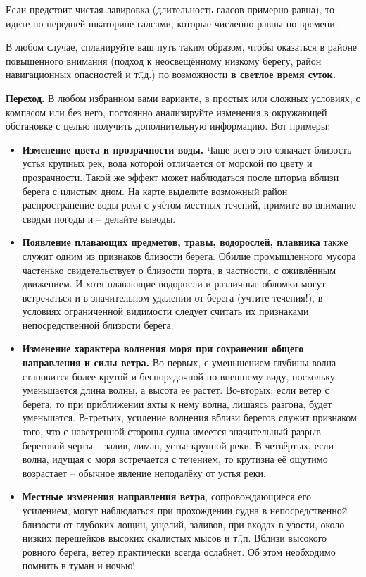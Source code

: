 \documentclass[a4paper, 12pt, twoside, final, book, russian, fittopage, cyremdash]{ncc}
\begin{document}
Если предстоит чистая лавировка (длительность галсов примерно равна), то идите по передней шкаторине галсами, которые численно равны по времени.

В любом случае, спланируйте ваш путь таким образом, чтобы оказаться в районе повышенного внимания (подход к неосвещённому низкому берегу, район навигационных опасностей и т.\=,д.) по возможности \textbf{в светлое время суток.} 

\textbf{Переход.} В любом избранном вами варианте, в простых или сложных условиях, с компасом или без него, постоянно анализируйте изменения в окружающей обстановке с целью получить дополнительную информацию. Вот примеры:

\begin{itemize} 
\item \textbf{Изменение цвета и прозрачности воды.} Чаще всего это означает близость устья крупных рек, вода которой отличается от морской по цвету и прозрачности. Такой же эффект может наблюдаться после шторма вблизи берега с илистым дном. На карте выделите возможный район распространение воды реки с учётом местных течений, примите во внимание сводки погоды и \--- делайте выводы. 
\item \textbf{Появление плавающих предметов, травы, водорослей, плавника} также служит одним из признаков близости берега. Обилие промышленного мусора частенько свидетельствует о близости порта, в частности, с оживлённым движением. И хотя плавающие водоросли и различные обломки могут встречаться и в значительном удалении от берега (учтите течения!), в условиях ограниченной видимости следует считать их признаками непосредственной близости берега. 
\item \textbf{Изменение характера волнения моря при сохранении общего направления и силы ветра.} Во-первых, с уменьшением глубины волна становится более крутой и беспорядочной по внешнему виду, поскольку уменьшается длина волны, а высота ее растет. Во-вторых, если ветер с берега, то при приближении яхты к нему волна, лишаясь разгона, будет уменьшатся. В-третьих, усиление волнения вблизи берегов служит признаком того, что с наветренной стороны судна имеется значительный разрыв береговой черты \--- залив, лиман, устье крупной реки. В-четвёртых, если волна, идущая с моря встречается с течением, то крутизна её ощутимо возрастает \--- обычное явление неподалёку от устья реки. 
\item \textbf{Местные изменения направления ветра}, сопровождающиеся его усилением, могут наблюдаться при прохождении судна в непосредственной близости от глубоких лощин, ущелий, заливов, при входах в узости, около низких перешейков высоких скалистых мысов и т.\=,п. Вблизи высокого ровного берега, ветер практически всегда ослабнет. Об этом необходимо помнить в туман и ночью! 

\end{itemize}
\end{document}

